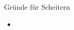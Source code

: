 

\begin{frame}[c]{Gründe für Scheitern}
    \begin{itemize}
        \item 
    \end{itemize}
\end{frame}


